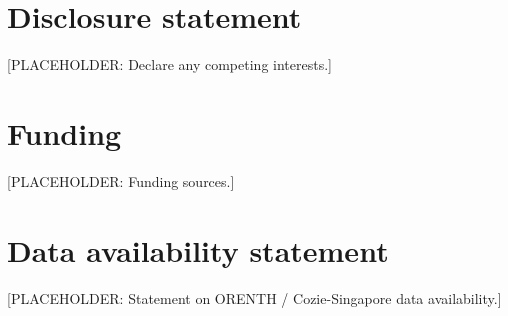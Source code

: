 \documentclass[]{interact}
\begin{document}
\section*{Disclosure statement}
[PLACEHOLDER: Declare any competing interests.]

\section*{Funding}
[PLACEHOLDER: Funding sources.]

\section*{Data availability statement}
[PLACEHOLDER: Statement on ORENTH / Cozie-Singapore data availability.]


\end{document}
